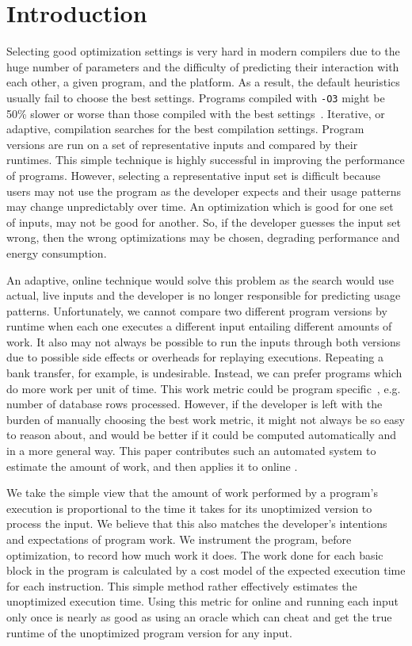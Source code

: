 \section{Introduction}

    Selecting good optimization settings is very hard in modern compilers due to the huge number of parameters and the difficulty of
    predicting their interaction with each other, a given program, and the platform. As a result, the default heuristics usually fail to
    choose the best settings. Programs compiled with \texttt{-O3} might be 50\% slower or worse than those compiled with the best
    settings~\cite{fursin07,chen12b}. Iterative, or adaptive, compilation searches for the best compilation settings. Program versions are
    run on a set of representative inputs and compared by their runtimes. This simple technique is highly successful in improving the
    performance of programs. However, selecting a representative input set is difficult because users may not use the program as the
    developer expects and their usage patterns may change unpredictably over time. An optimization which is good for one set of inputs, may
    not be good for another. So, if the developer guesses the input set wrong, then the wrong optimizations may be chosen, degrading
    performance and energy consumption.

    An adaptive, online technique would solve this problem as the search would use actual, live inputs and the developer is no longer
    responsible for predicting usage patterns. Unfortunately, we cannot compare two different program versions by runtime when each one
    executes a different input entailing different amounts of work. It also may not always be possible to run the inputs through both
    versions due to possible side effects or overheads for replaying executions. Repeating a bank transfer, for example, is undesirable.
    Instead, we can prefer programs which do more work per unit of time. This work metric could be program
    specific~\cite{alameldeen06,coppa14}, e.g. number of database rows processed. However, if the developer is left with the burden of
    manually choosing the best work metric, it might not always be so easy to reason about, and would be better if it could be computed
    automatically and in a more general way. This paper contributes such an automated system to estimate the amount of work, and then
    applies it to online {\itercomp}.

    We take the simple view that the amount of work performed by a program's execution is proportional to the time it takes for its
    unoptimized version to process the input. We believe that this also matches the developer's intentions and expectations of program
    work. We instrument the program, before optimization, to record how much work it does. The work done for each basic block in the
    program is calculated by a cost model of the expected execution time for each instruction. This simple method rather effectively
    estimates the unoptimized execution time. Using this metric for online {\itercomp} and running each input only once is nearly as good
    as using an oracle which can cheat and get the true runtime of the unoptimized program version for any input.

